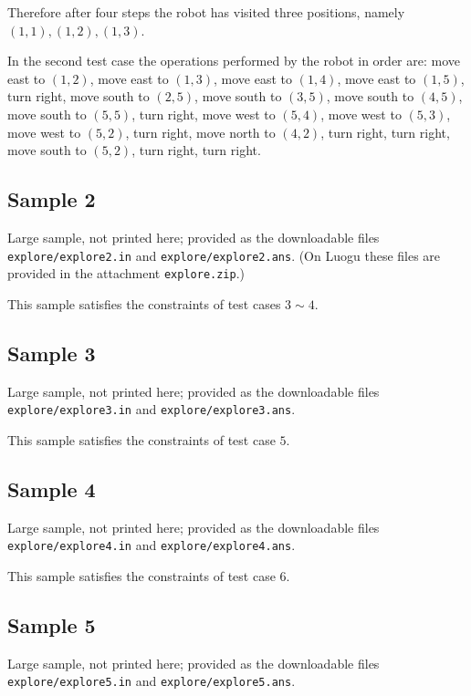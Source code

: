 \documentclass[11pt]{article}
\begin{document}
Therefore after four steps the robot has visited three positions, namely
$(1, 1), (1, 2), (1, 3)$.

In the second test case the operations performed by the robot in order are:
move east to $(1, 2)$, move east to $(1, 3)$, move east to $(1, 4)$,
move east to $(1, 5)$, turn right, move south to $(2, 5)$,
move south to $(3, 5)$, move south to $(4, 5)$, move south to $(5, 5)$,
turn right, move west to $(5, 4)$, move west to $(5, 3)$,
move west to $(5, 2)$, turn right, move north to $(4, 2)$, turn right,
turn right, move south to $(5, 2)$, turn right, turn right.

\subsection*{Sample 2}

Large sample, not printed here;
provided as the downloadable files \texttt{explore/explore2.in} and \texttt{explore/explore2.ans}.
(On Luogu these files are provided in the attachment \texttt{explore.zip}.)

This sample satisfies the constraints of test cases $3 \sim 4$.

\subsection*{Sample 3}

Large sample, not printed here;
provided as the downloadable files \texttt{explore/explore3.in} and \texttt{explore/explore3.ans}.

This sample satisfies the constraints of test case $5$.

\subsection*{Sample 4}

Large sample, not printed here;
provided as the downloadable files \texttt{explore/explore4.in} and \texttt{explore/explore4.ans}.

This sample satisfies the constraints of test case $6$.

\subsection*{Sample 5}

Large sample, not printed here;
provided as the downloadable files \texttt{explore/explore5.in} and \texttt{explore/explore5.ans}.
\end{document}
